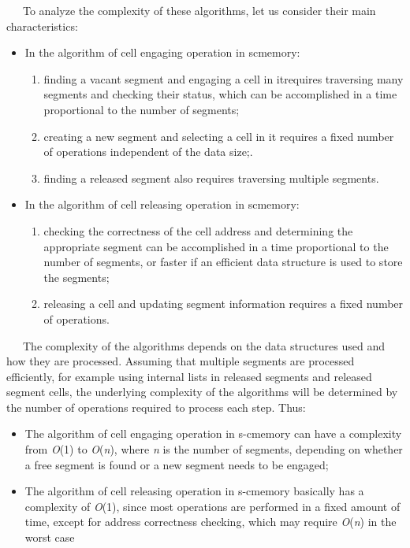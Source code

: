 \documentclass[10pt, a4paper, twocolumn]{article}
\begin{document}
\par \ \ \ To analyze the complexity of these algorithms, let us
consider their main characteristics:
\begin{itemize}
    \item In the algorithm of cell engaging operation in scmemory:
        \begin{enumerate}[label=\textbf{--}, leftmargin=*, listparindent=2em, noitemsep,topsep=0pt,parsep=0pt,partopsep=0pt]
            \item finding a vacant segment and engaging a cell in itrequires traversing many segments and checking their status, which can be accomplished in a time proportional to the number of segments;
            \item creating a new segment and selecting a cell in it requires a fixed number of operations independent of the data size;.
            \item finding a released segment also requires traversing multiple segments.
        \end{enumerate}
        \item In the algorithm of cell releasing operation in scmemory:
        \begin{enumerate}[label=\textbf{--}, leftmargin=*, listparindent=2em, noitemsep,topsep=0pt,parsep=0pt,partopsep=0pt]
        \item checking the correctness of the cell address and determining the appropriate segment can be accomplished in a time proportional to the number of segments, or faster if an efficient data structure is used to store the segments;
        \item releasing a cell and updating segment information requires a fixed number of operations.
        \end{enumerate}
\end{itemize}
\par \ \ \ The complexity of the algorithms depends on the
data structures used and how they are processed. Assuming that multiple segments are processed efficiently,
for example using internal lists in released segments
and released segment cells, the underlying complexity
of the algorithms will be determined by the number of
operations required to process each step. Thus:
\begin{itemize}
    \item The algorithm of cell engaging operation in s-cmemory can have a complexity from \textit{O}(1) to \textit{O}(\textit{n}), where \textit{n} is the number of segments, depending on whether a free segment is found or a new segment needs to be engaged;
    \item The algorithm of cell releasing operation in s-cmemory basically has a complexity of \textit{O}(1), since most operations are performed in a fixed amount of time, except for address correctness checking, which may require \textit{O}(\textit{n}) in the worst case
\end{itemize}
\end{document}
